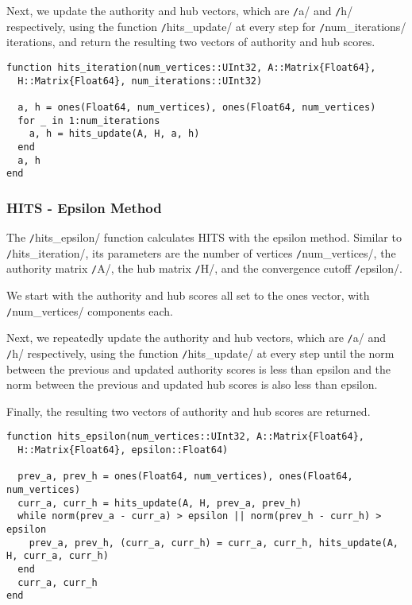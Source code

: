 \documentclass[12pt, titlepage, twoside]{amsart}
\theoremstyle{remark}
\begin{document}
Next, we update the authority and hub vectors, which are \texttt/a/ and \texttt/h/ respectively,
using the function \texttt/hits_update/ at every step for \texttt/num_iterations/ iterations, and return the resulting two vectors of authority and hub scores.

\begin{verbatim}
function hits_iteration(num_vertices::UInt32, A::Matrix{Float64}, 
  H::Matrix{Float64}, num_iterations::UInt32)
  
  a, h = ones(Float64, num_vertices), ones(Float64, num_vertices)
  for _ in 1:num_iterations
    a, h = hits_update(A, H, a, h)
  end
  a, h
end
\end{verbatim}


\subsubsection{HITS - Epsilon Method}

The \texttt/hits_epsilon/ function calculates HITS with the epsilon method.
Similar to \texttt/hits_iteration/, its parameters are the number of vertices \texttt/num_vertices/,
the authority matrix \texttt/A/, the hub matrix \texttt/H/,
and the convergence cutoff \texttt/epsilon/.

We start with the authority and hub scores all set to the ones vector, with \texttt/num_vertices/ components each.

Next, we repeatedly update the authority and hub vectors,
which are \texttt/a/ and \texttt/h/ respectively,
using the function \texttt/hits_update/ at every step until
the norm between the previous and updated authority scores is less than epsilon and
the norm between the previous and updated hub scores is also less than epsilon.

Finally, the resulting two vectors of authority and hub scores are returned.

\begin{verbatim}
function hits_epsilon(num_vertices::UInt32, A::Matrix{Float64},
  H::Matrix{Float64}, epsilon::Float64)
  
  prev_a, prev_h = ones(Float64, num_vertices), ones(Float64, num_vertices)
  curr_a, curr_h = hits_update(A, H, prev_a, prev_h)
  while norm(prev_a - curr_a) > epsilon || norm(prev_h - curr_h) > epsilon
    prev_a, prev_h, (curr_a, curr_h) = curr_a, curr_h, hits_update(A, H, curr_a, curr_h)
  end
  curr_a, curr_h
end
\end{verbatim}
\end{document}
